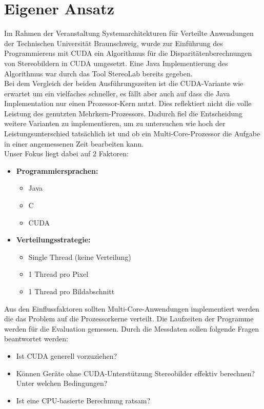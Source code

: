 \documentclass[%
  a4paper,%
  12pt,%
  style=screen, %
  oneside,
  blue,%
  ]{tubsartcl}
\begin{document}
\section{Eigener Ansatz}
Im Rahmen der Veranstaltung \glqq Systemarchitekturen für Verteilte Anwendungen\grqq{} der Technischen Universität
Braunschweig, wurde zur Einführung des Programmierens mit CUDA ein Algorithmus für die Disparitätenberechnungen von
Stereobildern in CUDA umgesetzt. Eine Java Implementierung des Algorithmus war durch das Tool StereoLab bereits
gegeben. \\
Bei dem Vergleich der beiden Ausführungszeiten ist die CUDA-Variante wie erwartet um ein vielfaches
schneller, es fällt aber auch auf dass die Java Implementation nur einen Prozessor-Kern nutzt. Dies reflektiert nicht
die volle Leistung des genutzten Mehrkern-Prozessors. Dadurch fiel die Entscheidung weitere Varianten zu
implementieren, um zu untersuchen wie hoch der Leistungsunterschied tatsächlich ist und ob ein Multi-Core-Prozessor die
Aufgabe in einer angemessenen Zeit bearbeiten kann. \\

\newpage
Unser Fokus liegt dabei auf 2 Faktoren:
\begin{itemize}
\item \textbf{Programmiersprachen:}
\begin{itemize}
\setlength{\itemsep}{-5pt}
\item Java
\item C
\item CUDA
\end{itemize}
\item \textbf{Verteilungsstrategie:}
\begin{itemize}
\setlength{\itemsep}{-5pt}
\item Single Thread (keine Verteilung)
\item 1 Thread pro Pixel
\item 1 Thread pro Bildabschnitt
\end{itemize}
\end{itemize}
Aus den Einflussfaktoren sollten Multi-Core-Anwendungen implementiert werden die das Problem auf die Prozessorkerne
verteilt. Die Laufzeiten der Programme werden für die Evaluation gemessen. Durch die Messdaten sollen folgende Fragen
beantwortet werden:
\begin{itemize}
\setlength{\itemsep}{-5pt}
\item Ist CUDA generell vorzuziehen?
\item Können Geräte ohne CUDA-Unterstützung Stereobilder effektiv berechnen? Unter welchen Bedingungen?
\item Ist eine CPU-basierte Berechnung ratsam?
\end{itemize}
\vspace{1cm}
 
\end{document}
